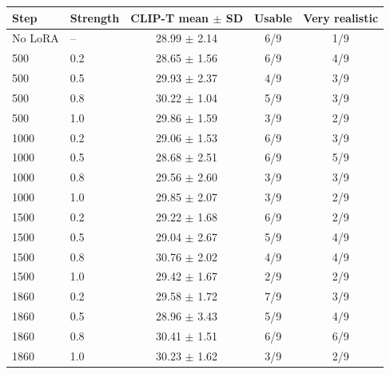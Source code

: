 \begin{tabular}{llccc}
\hline
Step & Strength & CLIP-T mean $\pm$ SD & Usable & Very realistic \\
\hline
No LoRA & -- & 28.99 $\pm$ 2.14 & 6/9 & 1/9 \\
500 & 0.2 & 28.65 $\pm$ 1.56 & 6/9 & 4/9 \\
500 & 0.5 & 29.93 $\pm$ 2.37 & 4/9 & 3/9 \\
500 & 0.8 & 30.22 $\pm$ 1.04 & 5/9 & 3/9 \\
500 & 1.0 & 29.86 $\pm$ 1.59 & 3/9 & 2/9 \\
1000 & 0.2 & 29.06 $\pm$ 1.53 & 6/9 & 3/9 \\
1000 & 0.5 & 28.68 $\pm$ 2.51 & 6/9 & 5/9 \\
1000 & 0.8 & 29.56 $\pm$ 2.60 & 3/9 & 3/9 \\
1000 & 1.0 & 29.85 $\pm$ 2.07 & 3/9 & 2/9 \\
1500 & 0.2 & 29.22 $\pm$ 1.68 & 6/9 & 2/9 \\
1500 & 0.5 & 29.04 $\pm$ 2.67 & 5/9 & 4/9 \\
1500 & 0.8 & 30.76 $\pm$ 2.02 & 4/9 & 4/9 \\
1500 & 1.0 & 29.42 $\pm$ 1.67 & 2/9 & 2/9 \\
1860 & 0.2 & 29.58 $\pm$ 1.72 & 7/9 & 3/9 \\
1860 & 0.5 & 28.96 $\pm$ 3.43 & 5/9 & 4/9 \\
1860 & 0.8 & 30.41 $\pm$ 1.51 & 6/9 & 6/9 \\
1860 & 1.0 & 30.23 $\pm$ 1.62 & 3/9 & 2/9 \\
\hline
\end{tabular}
